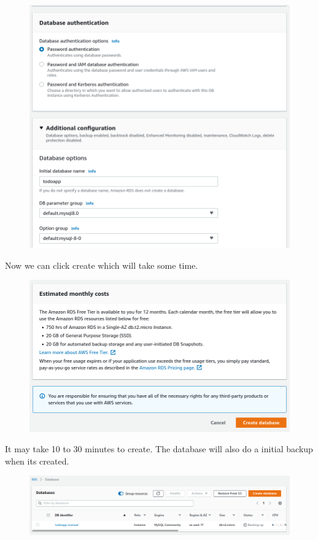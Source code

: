 \documentclass{csse4400}
\begin{document}
\begin{figure}[H]
  \includegraphics[width=\textwidth]{images/db7}
\end{figure}

Now we can click create which will take some time.

\begin{figure}[H]
  \includegraphics[width=\textwidth]{images/db8}
\end{figure}

It may take 10 to 30 minutes to create.
The database will also do a initial backup when its created.

\begin{figure}[H]
  \includegraphics[width=\textwidth]{images/aws_4}
\end{figure}
\end{document}
